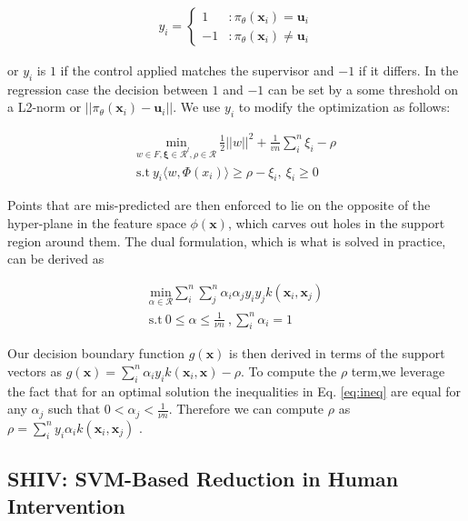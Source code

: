 \documentclass[10pt, conference]{ieeeconf}      %
\newcommand{\bu}{\mathbf{u}}
\newcommand{\bx}{\mathbf{x}}
\newcommand{\mR}{\mathcal{R}}
\begin{document}
\begin{align}
y_i = \left\{
     \begin{array}{lr}
       1 & : \pi_{\theta}(\bx_i) =\bu_i\\
       -1 & : \pi_{\theta}(\bx_i) \neq \bu_i
     \end{array}
   \right.
\end{align}

or $y_i$ is $1$ if the control applied matches the supervisor and $-1$ if it differs. In the regression case the decision between $1$ and $-1$ can be set by a some threshold on a L2-norm or $||\pi_{\theta}(\bx_i)-\bu_i||$. We use $y_i$ to modify the optimization as follows: 

\vspace{-2ex}
\begin{align}\label{eq:primal_sup}
\underset{w\in F, \mathbf{\xi} \in \mR^l, \rho \in \mR}{\mbox{min}}\: \frac{1}{2}||w||^2+\frac{1}{vn} \sum^n_i \xi_i - \rho\\
\mbox{s.t} \: y_i \langle w,\Phi(x_i)\rangle \geq \rho - \xi_i, \: \xi_i \geq 0 \label{eq:ineq}
\end{align}

Points that are mis-predicted are then enforced to lie on the opposite of the hyper-plane in the feature space $\phi(\bx)$, which carves out holes in the support region around them. The dual formulation, which is what is solved in practice, can be derived as 

\vspace{-2ex}
\begin{align}\label{eq:dual_sup}
\underset{\alpha\in \mathcal{R}}{\mbox{min}} \sum_i^n \sum_j^n \alpha_i\alpha_j y_i y_jk(\bx_i,\bx_j)\\
\mbox{s.t} \: 0 \leq \alpha \leq \frac{1}{\nu n} \:, \sum_i^n \alpha_i = 1 
\end{align}

Our decision boundary function $g(\bx)$ is then derived in terms of the support vectors as $g(\bx) = \sum_i^n \alpha_i y_i k(\bx_i,\bx) - \rho$. To compute the $\rho$ term,we leverage the fact that for an optimal solution the inequalities in Eq. \ref{eq:ineq} are equal for any $\alpha_j$ such that $0 < \alpha_j < \frac{1}{\nu n}$. Therefore we can compute $\rho$ as  $\rho = \sum_i^n y_i \alpha_i k(\bx_i,\bx_j)$ \cite{scholkopf2001estimating}. 




\subsection{SHIV: SVM-Based Reduction in Human Intervention}
\end{document}
